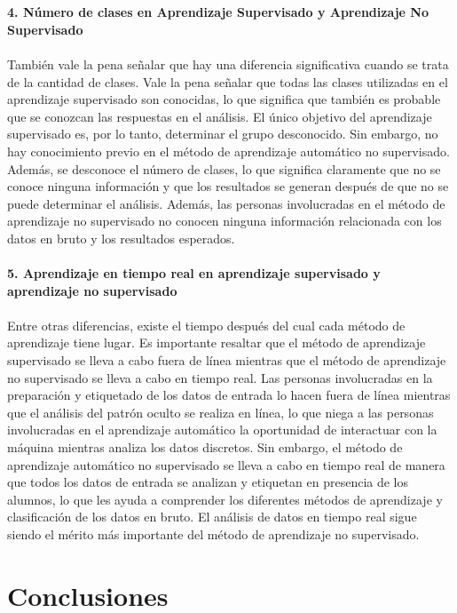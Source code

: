 \documentclass[%
 reprint,
 amsmath,amssymb,
 aps,
]{revtex4-1}
\begin{document}
\textbf{}\\  
\textbf{}\\ 
\textbf{4. Número de clases en Aprendizaje Supervisado y Aprendizaje No Supervisado}\\   
\textbf{}\\ 
También vale la pena señalar que hay una diferencia significativa cuando se trata de la cantidad de clases. Vale la pena señalar que todas las clases utilizadas en el aprendizaje supervisado son conocidas, lo que significa que también es probable que se conozcan las respuestas en el análisis. El único objetivo del aprendizaje supervisado es, por lo tanto, determinar el grupo desconocido. Sin embargo, no hay conocimiento previo en el método de aprendizaje automático no supervisado. Además, se desconoce el número de clases, lo que significa claramente que no se conoce ninguna información y que los resultados se generan después de que no se puede determinar el análisis. Además, las personas involucradas en el método de aprendizaje no supervisado no conocen ninguna información relacionada con los datos en bruto y los resultados esperados.
\textbf{}\\  
\textbf{}\\ 
\textbf{5. Aprendizaje en tiempo real en aprendizaje supervisado y aprendizaje no supervisado}\\   
\textbf{}\\ 
Entre otras diferencias, existe el tiempo después del cual cada método de aprendizaje tiene lugar. Es importante resaltar que el método de aprendizaje supervisado se lleva a cabo fuera de línea mientras que el método de aprendizaje no supervisado se lleva a cabo en tiempo real. Las personas involucradas en la preparación y etiquetado de los datos de entrada lo hacen fuera de línea mientras que el análisis del patrón oculto se realiza en línea, lo que niega a las personas involucradas en el aprendizaje automático la oportunidad de interactuar con la máquina mientras analiza los datos discretos. Sin embargo, el método de aprendizaje automático no supervisado se lleva a cabo en tiempo real de manera que todos los datos de entrada se analizan y etiquetan en presencia de los alumnos, lo que les ayuda a comprender los diferentes métodos de aprendizaje y clasificación de los datos en bruto. El análisis de datos en tiempo real sigue siendo el mérito más importante del método de aprendizaje no supervisado.

\section{Conclusiones}
\end{document}
